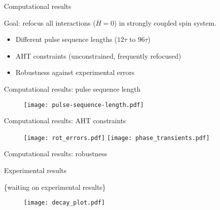 \documentclass{beamer}
\begin{document}
\begin{frame}{Computational results}



Goal: refocus all interactions (\(\overline{H}=0\)) in strongly coupled spin system.
\begin{itemize}
    \item Different pulse sequence lengths ($12\tau$ to $96\tau$)
    \item AHT constraints (unconstrained, frequently refocused)
    \item Robustness against experimental errors
\end{itemize}

\end{frame}

\begin{frame}{Computational results: pulse sequence length}

\begin{figure}
\centering
\texttt{[image: pulse-sequence-length.pdf]}
\end{figure}


\end{frame}


\begin{frame}{Computational results: AHT constraints}

\begin{figure}
\centering
\texttt{[image: rot\_errors.pdf]}
\texttt{[image: phase\_transients.pdf]}
\end{figure}

\end{frame}


\begin{frame}{Computational results: robustness}


\end{frame}

\begin{frame}{Experimental results}

\{waiting on experimental results\}

\begin{figure}
\centering
\texttt{[image: decay\_plot.pdf]}
\end{figure}


\end{frame}
\end{document}
